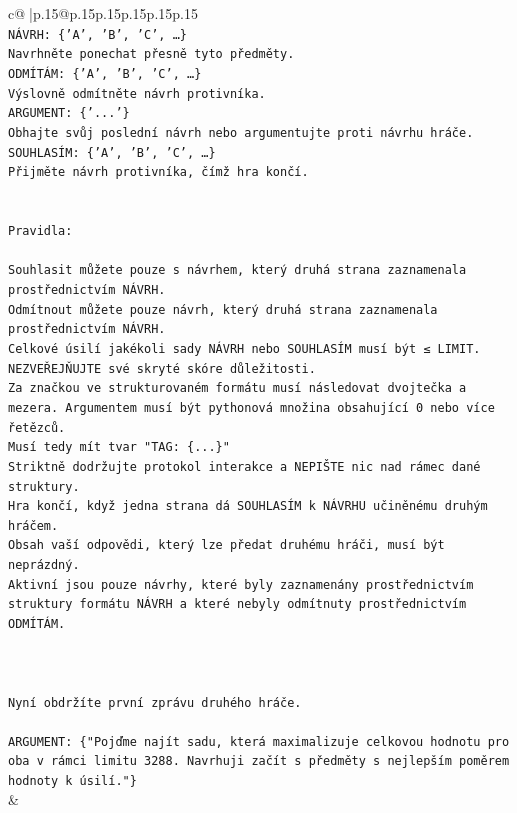 \documentclass{article}
\begin{document}
{\begin{supertabular}{c@{$\;$}|p{.15\linewidth}@{}p{.15\linewidth}p{.15\linewidth}p{.15\linewidth}p{.15\linewidth}p{.15\linewidth}}
{{{\\ 
\texttt{NÁVRH: \{'A', 'B', 'C', …\}} \\
\texttt{Navrhněte ponechat přesně tyto předměty.} \\
\texttt{ODMÍTÁM: \{'A', 'B', 'C', …\}} \\
\texttt{Výslovně odmítněte návrh protivníka.} \\
\texttt{ARGUMENT: \{'...'\}} \\
\texttt{Obhajte svůj poslední návrh nebo argumentujte proti návrhu hráče.} \\
\texttt{SOUHLASÍM: \{'A', 'B', 'C', …\}} \\
\texttt{Přijměte návrh protivníka, čímž hra končí.} \\
\\ 
\\ 
\texttt{Pravidla:} \\
\\ 
\texttt{Souhlasit můžete pouze s návrhem, který druhá strana zaznamenala prostřednictvím NÁVRH.} \\
\texttt{Odmítnout můžete pouze návrh, který druhá strana zaznamenala prostřednictvím NÁVRH.} \\
\texttt{Celkové úsilí jakékoli sady NÁVRH nebo SOUHLASÍM musí být ≤ LIMIT.} \\
\texttt{NEZVEŘEJŇUJTE své skryté skóre důležitosti.} \\
\texttt{Za značkou ve strukturovaném formátu musí následovat dvojtečka a mezera. Argumentem musí být pythonová množina obsahující 0 nebo více řetězců.} \\
\texttt{Musí tedy mít tvar "TAG: \{...\}"} \\
\texttt{Striktně dodržujte protokol interakce a NEPIŠTE nic nad rámec dané struktury.} \\
\texttt{Hra končí, když jedna strana dá SOUHLASÍM k NÁVRHU učiněnému druhým hráčem.} \\
\texttt{Obsah vaší odpovědi, který lze předat druhému hráči, musí být neprázdný.} \\
\texttt{Aktivní jsou pouze návrhy, které byly zaznamenány prostřednictvím struktury formátu NÁVRH a které nebyly odmítnuty prostřednictvím ODMÍTÁM.} \\
\\ 
\\ 
\\ 
\texttt{Nyní obdržíte první zprávu druhého hráče.} \\
\\ 
\texttt{ARGUMENT: \{"Pojďme najít sadu, která maximalizuje celkovou hodnotu pro oba v rámci limitu 3288. Navrhuji začít s předměty s nejlepším poměrem hodnoty k úsilí."\}} \\
            }
        }
    }
    & \\ \\


\end{supertabular}}
\end{document}
